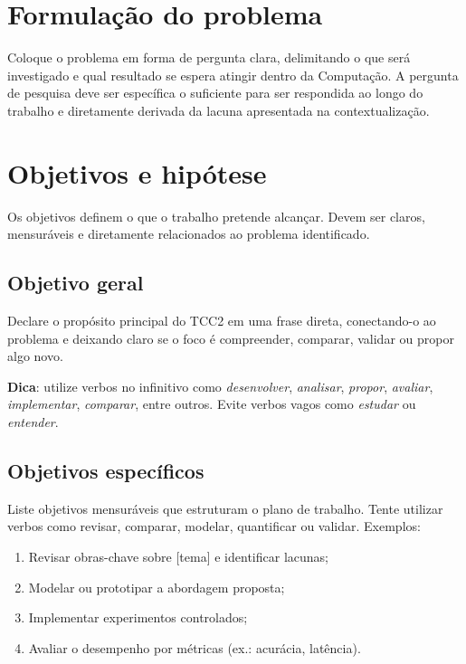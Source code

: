 \documentclass[
    12pt,                %
    openright,           %
    oneside,             %
    a4paper,             %
    english,             %
    brazil               %
]{abntex2}
\begin{document}
\section{Formulação do problema}
\label{sec:problema}

Coloque o problema em forma de pergunta clara, delimitando o que será investigado e qual resultado se espera atingir dentro da Computação. A pergunta de pesquisa deve ser específica o suficiente para ser respondida ao longo do trabalho e diretamente derivada da lacuna apresentada na contextualização.

\section{Objetivos e hipótese}
\label{sec:objetivos}

Os objetivos definem o que o trabalho pretende alcançar. Devem ser claros, mensuráveis e diretamente relacionados ao problema identificado.

\subsection{Objetivo geral}

Declare o propósito principal do TCC2 em uma frase direta, conectando-o ao problema e deixando claro se o foco é compreender, comparar, validar ou propor algo novo.

\textbf{Dica}: utilize verbos no infinitivo como \textit{desenvolver}, \textit{analisar}, \textit{propor}, \textit{avaliar}, \textit{implementar}, \textit{comparar}, entre outros. Evite verbos vagos como \textit{estudar} ou \textit{entender}.

\subsection{Objetivos específicos}

Liste objetivos mensuráveis que estruturam o plano de trabalho. Tente utilizar verbos como revisar, comparar, modelar, quantificar ou validar. Exemplos:

\begin{enumerate}
    \item Revisar obras-chave sobre [tema] e identificar lacunas;
    \item Modelar ou prototipar a abordagem proposta;
    \item Implementar experimentos controlados;
    \item Avaliar o desempenho por métricas (ex.: acurácia, latência).
\end{enumerate}
\end{document}
